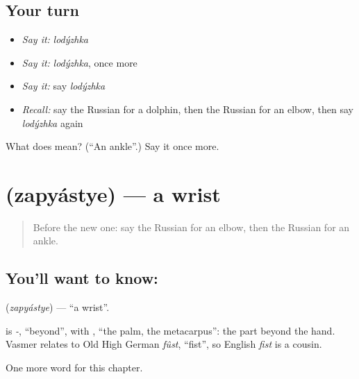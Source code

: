 \subsection*{Your turn}
\begin{itemize}
\raggedright
  \item \emph{Say it:} \emph{lodýzhka}
  \item \emph{Say it:} \emph{lodýzhka}, once more
  \item \emph{Say it:} say \emph{lodýzhka}
  \item \emph{Recall:} say the Russian for a dolphin, then the Russian for an elbow, then say \emph{lodýzhka} again
\end{itemize}

\begin{tcolorbox}[breakable,colback=teal!4,colframe=teal!35!black,title={Before you move on}]
What does  mean? (\textquotedblleft{}An ankle\textquotedblright{}.) Say it once more.
\end{tcolorbox}
\section[\texorpdfstring{\ru{запястье} (zapyástye)}{запястье (zapyástye)}]{ (zapyástye) — a wrist}

\label{lesson:RU-C119-wrist}



\begin{quote}
Before the new one: say the Russian for an elbow, then the Russian for an ankle.
\end{quote}

\subsection*{You'll want to know: }
\textbf{} (\emph{zapyástye}) — \textquotedblleft{}a wrist\textquotedblright{}.

\begin{cousinweb}
\textbf{} is \emph{-}, \textquotedblleft{}beyond\textquotedblright{}, with \emph{}, \textquotedblleft{}the palm, the metacarpus\textquotedblright{}: the part beyond the hand. Vasmer relates \emph{} to Old High German \emph{fûst}, \textquotedblleft{}fist\textquotedblright{}, so English \emph{fist} is a cousin.
\end{cousinweb}

\begin{grammarlens}[title={What you've built}]
One more word for this chapter.
\end{grammarlens}

